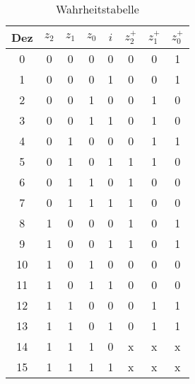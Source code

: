 \begin{table}[H]
    \centering
    \begin{tabular}{|c|c|c|c|c|c|c|c|}
        \hline
        Dez & $z_2$ & $z_1$ & $z_0$ & $i$ & $z_2^+$ & $z_1^+$ & $z_0^+$ \\
        \hline
        0   & 0     & 0     & 0     & 0   & 0       & 0       & 1       \\
        1   & 0     & 0     & 0     & 1   & 0       & 0       & 1       \\
        2   & 0     & 0     & 1     & 0   & 0       & 1       & 0       \\
        3   & 0     & 0     & 1     & 1   & 0       & 1       & 0       \\
        4   & 0     & 1     & 0     & 0   & 0       & 1       & 1       \\
        5   & 0     & 1     & 0     & 1   & 1       & 1       & 0       \\
        6   & 0     & 1     & 1     & 0   & 1       & 0       & 0       \\
        7   & 0     & 1     & 1     & 1   & 1       & 0       & 0       \\
        8   & 1     & 0     & 0     & 0   & 1       & 0       & 1       \\
        9   & 1     & 0     & 0     & 1   & 1       & 0       & 1       \\
        10  & 1     & 0     & 1     & 0   & 0       & 0       & 0       \\
        11  & 1     & 0     & 1     & 1   & 0       & 0       & 0       \\
        12  & 1     & 1     & 0     & 0   & 0       & 1       & 1       \\
        13  & 1     & 1     & 0     & 1   & 0       & 1       & 1       \\
        14  & 1     & 1     & 1     & 0   & x       & x       & x       \\
        15  & 1     & 1     & 1     & 1   & x       & x       & x       \\
        \hline
    \end{tabular}
    \caption{Wahrheitstabelle}
    \label{tab:wahrheitstabelle}
\end{table}

